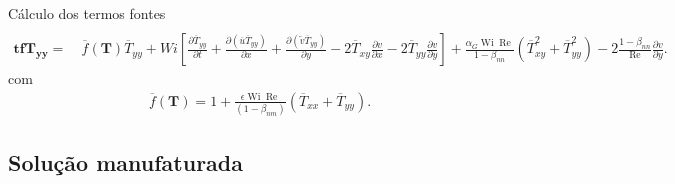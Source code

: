 \begin{frame}{Cálculo dos termos fontes}
\begin{equation*}
\begin{aligned}
    \end{aligned}
    \label{eq_lpog_txy_s_t_2}
\end{equation*}
\begin{equation*}
    \begin{aligned}
        \mathbf{tfT_{yy}} = &~\overline{f}(\mathbf{T})\overline{T}_{yy} + Wi\left[\frac{\partial \overline{T}_{yy}}{\partial t} + \frac{\partial (\overline{u}\overline{T}_{yy})}{\partial x} + \frac{\partial (\widetilde{v}\overline{T}_{yy})}{\partial y} - 2\overline{T}_{xy}\frac{\partial v}{\partial x} - 2\overline{T}_{yy}\frac{\partial v}{\partial y}\right] + \frac{\alpha_{G}\operatorname{Wi}\operatorname{Re}}{1-\beta_{nn}}\left(\overline{T}_{xy}^{2} + \overline{T}_{yy}^{2}\right) - 2\frac{1-\beta_{nn}}{\operatorname{Re}}\frac{\partial v}{\partial y}.
    \end{aligned}
    \label{eq_lpog_tyy_s_t_2}
\end{equation*}
\normalsize
com
\footnotesize
\begin{equation}
    \begin{split}
        \overline{f}(\mathbf{T}) = 1+\frac{\epsilon \operatorname{Wi} \operatorname{Re}}{(1 - \beta_{nm})} \left(\overline{T}_{xx} + \overline{T}_{yy}\right).
    \end{split}\label{eq_funcao_traco_tensor_bidime_manufaturada}
\end{equation}
\normalsize
\end{frame}

\subsection{Solução manufaturada}

